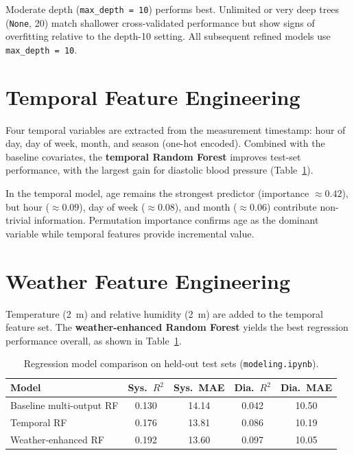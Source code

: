 Moderate depth (\texttt{max\_depth = 10}) performs best. Unlimited or very deep trees (\texttt{None}, 20) match shallower cross-validated performance but show signs of overfitting relative to the depth-10 setting. All subsequent refined models use \texttt{max\_depth = 10}.

\section{Temporal Feature Engineering}
\label{sec:modelling_temporal}

Four temporal variables are extracted from the measurement timestamp: hour of day, day of week, month, and season (one-hot encoded). Combined with the baseline covariates, the \textbf{temporal Random Forest} improves test-set performance, with the largest gain for diastolic blood pressure (Table~\ref{tab:model_comparison}).

In the temporal model, age remains the strongest predictor (importance $\approx 0.42$), but hour ($\approx 0.09$), day of week ($\approx 0.08$), and month ($\approx 0.06$) contribute non-trivial information. Permutation importance confirms age as the dominant variable while temporal features provide incremental value.

\section{Weather Feature Engineering}
\label{sec:modelling_weather_features}

Temperature (2~m) and relative humidity (2~m) are added to the temporal feature set. The \textbf{weather-enhanced Random Forest} yields the best regression performance overall, as shown in Table~\ref{tab:model_comparison}.

\begin{table}[h]
    \centering
    \caption{Regression model comparison on held-out test sets (\texttt{modeling.ipynb}).}
    \label{tab:model_comparison}
    \begin{tabular}{lcccc}
        \toprule
        \textbf{Model} & \textbf{Sys.\ $R^2$} & \textbf{Sys.\ MAE} & \textbf{Dia.\ $R^2$} & \textbf{Dia.\ MAE} \\
        \midrule
        Baseline multi-output RF       & 0.130 & 14.14 & 0.042 & 10.50 \\
        Temporal RF                    & 0.176 & 13.81 & 0.086 & 10.19 \\
        Weather-enhanced RF            & 0.192 & 13.60 & 0.097 & 10.05 \\
        \bottomrule
    \end{tabular}
\end{table}

